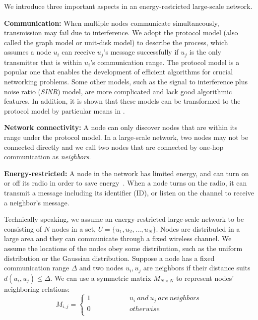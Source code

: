 We introduce three important aspects in an energy-restricted large-scale
network.

\textbf{Communication:}
When multiple nodes communicate simultaneously, transmission may fail
due to interference. We adopt the protocol model
(also called the graph model or unit-disk model\cite{moscibroda2006complexity,
wang2015connectivity}) to describe the process, which assumes a node
$u_i$ can receive $u_j$'s message successfully if $u_j$ is the only
transmitter that is within $u_i$'s communication range.
The protocol model is a popular one that enables the development of
efficient algorithms for crucial networking problems. Some other models,
such as the signal to interference plus noise ratio (\emph{SINR}) model,
are more complicated and lack good algorithmic features. %
In addition, it
is shown that these models can be transformed to the protocol model by
particular means in \cite{lebhar2009unit, halldorsson2015well}.

\textbf{Network connectivity:}
A node can only discover nodes that are within its range under the
protocol model. In a large-scale network, two nodes may not be connected
directly and we call two nodes that are connected by one-hop communication as
\emph{neighbors}.

\textbf{Energy-restricted:}
A node in the network has limited energy, and can turn on or off its
radio in order to save energy~\cite{dunkels2011contikimac, zhang2017performance}.
When a node turns on the radio, it can transmit a message including its
identifier (ID), or listen on the channel to receive a neighbor's
message.

Technically speaking, we assume an energy-restricted large-scale network
to be consisting of $N$ nodes in a set, $U=\{u_1,u_2,\ldots,u_N\}$.  Nodes are
distributed in a large area and they can communicate through a fixed
wireless channel. We assume the locations of the nodes obey some
distribution, such as the uniform distribution or the Gaussian
distribution\cite{wang2013gaussian}.
Suppose a node has a fixed communication range $\Delta$ and two nodes
$u_i, u_j$ are neighbors if their distance suits $d(u_i, u_j) \leq
\Delta$. We can use a symmetric matrix $M_{N\times N}$ to represent
nodes' neighboring relations:
$$ M_{i,j}=\left\{
\begin{aligned}
1  & & & & & & &{u_i ~and~ u_j ~are~ neighbors}\\
0  & & & & & & &{otherwise}\\
\end{aligned}
\right.
$$

